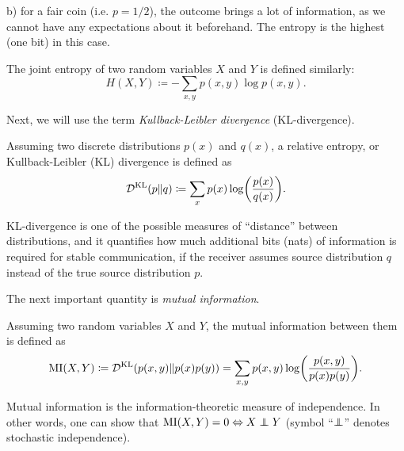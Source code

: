 b) for a fair coin (i.e. $p = 1/2$), the outcome brings a lot of information, as
we cannot have any expectations about it beforehand. The entropy is the
highest (one bit) in this case.

The joint entropy of two random variables $X$ and $Y$ is defined similarly:
\begin{equation}
  H(X, Y) \coloneqq -\sum_{x, y} p(x, y) \log p(x, y).
\end{equation}

Next, we will use the term \textit{Kullback-Leibler divergence} (KL-divergence).
\begin{definition}[KL-divergence]
\label{def:kl_divergence}
  Assuming two discrete distributions $p(x)$ and $q(x)$, a relative entropy, or
  Kullback-Leibler (KL) divergence is defined as
  \begin{equation}
    \mathcal{D}^{\text{KL}}(p \| q) \coloneqq \sum_{x} p(x) \log \biggl( \frac{p(x)}{q(x)} \biggr).
  \end{equation}
\end{definition}
KL-divergence is one of the possible measures of ``distance'' between
distributions, and it quantifies how much additional bits (nats) of information
is required for stable communication, if the receiver assumes source
distribution $q$ instead of the true source distribution $p$.

The next important quantity is \textit{mutual information}. 
\begin{definition}
\label{def:inf_theory_mutual_information}
  Assuming two random variables $X$ and $Y$, the mutual information between them
  is defined as
  \begin{equation}
    \mathrm{MI}(X, Y) \coloneqq \mathcal{D}^{\text{KL}}(p(x, y) \| p(x) p(y)) = \sum_{x,y} p(x, y)
      \log \biggl( \frac{p(x, y)}{p(x)p(y)} \biggr).
  \end{equation}
\end{definition}
Mutual information is the information-theoretic measure of independence. In other
words, one can show that $\MI(X, Y) = 0 \Leftrightarrow X \independent Y$ (symbol
``$\independent$'' denotes stochastic independence).
%


